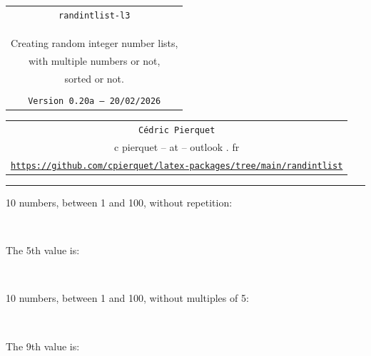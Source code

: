 \documentclass[11pt,a4paper]{ltxdoc}
\def\TPversion{0.20a}
\def\TPdate{20/02/2026}
\begin{document}
\thispagestyle{empty}

\begin{center}
	\begin{minipage}{0.88\linewidth}
		\begin{tcolorbox}[colframe=yellow,colback=yellow!15]
			\begin{center}
				\renewcommand{\arraystretch}{1.25}%
				\begin{tabular}{c}
					{\Huge \texttt{randintlist-l3}}\\
					\\
					{\Large\hologo{LaTeX3}}\\
					\\
					{\LARGE Creating random integer number lists,} \\
					{\LARGE with multiple numbers or not,} \\
					{\LARGE sorted or not.} \\
					\\
					{\small \texttt{Version \TPversion{} -- \TPdate}}
				\end{tabular}
			\end{center}
		\end{tcolorbox}
	\end{minipage}
\end{center}

\begin{center}
	\begin{tabular}{c}
		\texttt{Cédric Pierquet}\\
		{\ttfamily c pierquet -- at -- outlook . fr}\\
		\texttt{\url{https://github.com/cpierquet/latex-packages/tree/main/randintlist}} \\
	\end{tabular}
\end{center}

\hrule

\vfill

\begin{tcolorbox}[colframe=lightgray,colback=lightgray!5]
10 numbers, between 1 and 100, without repetition:

\hfill\rdlgenlist[min=1,max=100,nb=10,repeat=false]{\mylist}\textcolor{red}{\mylist}\hfill~

The 5th value is:

\hfill\textcolor{blue}{}\hfill~
\end{tcolorbox}

\begin{tcolorbox}[colframe=lightgray,colback=lightgray!5]
10 numbers, between 1 and 100, without multiples of 5:

\hfill\rdlgenlist[min=1,max=100,nb=10,excluded={5,10,15,20,25,30,35,40,45,50,55,60,65,70,75,80,85,90,95,100}]{\mylist}\textcolor{olive}{\mylist}\hfill~

The 9th value is:

\hfill\textcolor{purple}{}\hfill~
\end{tcolorbox}
\end{document}
